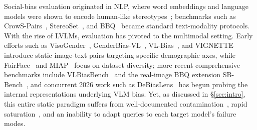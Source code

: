 \documentclass[lettersize,journal]{IEEEtran}
\begin{document}
Social-bias evaluation originated in NLP, where word embeddings and language models were shown to encode human-like stereotypes~\cite{bolukbasi2016man,caliskan2017semantics}; benchmarks such as CrowS-Pairs~\cite{nangia2020crows}, StereoSet~\cite{nadeem2021stereoset}, and BBQ~\cite{parrish2022bbq} became standard text-modality protocols.
With the rise of LVLMs, evaluation has pivoted to the multimodal setting.
Early efforts such as VisoGender~\cite{hall2023visogender}, GenderBias-VL~\cite{xiao2025genderbias}, VL-Bias~\cite{zhang2022counterfactually}, and VIGNETTE~\cite{raj2025vignette} introduce static image-text pairs targeting specific demographic axes, while FairFace~\cite{karkkainen2021fairface} and MIAP~\cite{schumann2021step} focus on dataset diversity; more recent comprehensive benchmarks include VLBiasBench~\cite{wang2024vlbiasbench} and the real-image BBQ extension SB-Bench~\cite{narnaware2025sbbench}, and concurrent 2026 work such as DeBiasLens~\cite{debiaslens2026} has begun probing the internal representations underlying VLM bias.
Yet, as discussed in \S\ref{sec:intro}, this entire static paradigm suffers from well-documented contamination~\cite{sainz2023nlp}, rapid saturation~\cite{kiela2021dynabench,yue2024mmmupro}, and an inability to adapt queries to each target model's failure modes.
\end{document}
